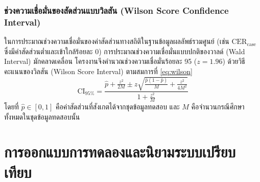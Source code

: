 \subsubsection{ช่วงความเชื่อมั่นของสัดส่วนแบบวิลสัน (Wilson Score Confidence Interval)}

ในการประมาณช่วงความเชื่อมั่นของค่าสัดส่วนทางสถิติในฐานข้อมูลผลลัพธ์รวมศูนย์ (เช่น $\mathrm{CER}_{\mathrm{case}}$ ซึ่งมีค่าสัดส่วนต่ำและเข้าใกล้ร้อยละ 0) การประมาณช่วงความเชื่อมั่นแบบปกติของวาลด์ (Wald Interval) มักคลาดเคลื่อน โครงงานจึงคำนวณช่วงความเชื่อมั่นร้อยละ 95 ($z = 1.96$) ด้วยวิธีคะแนนของวิลสัน (Wilson Score Interval) \cite{wilson1927probable} ตามสมการที่ \eqref{eq:wilson}
\begin{equation}
\mathrm{CI}_{95\%} = \frac{\hat{p} + \frac{z^2}{2M} \pm z \sqrt{\frac{\hat{p}(1-\hat{p})}{M} + \frac{z^2}{4M^2}}}{1 + \frac{z^2}{M}}
\label{eq:wilson}
\end{equation}
โดยที่ $\hat{p} \in [0, 1]$ คือค่าสัดส่วนที่สังเกตได้จากชุดข้อมูลทดสอบ และ $M$ คือจำนวนกรณีศึกษาทั้งหมดในชุดข้อมูลทดสอบนั้น

\section{การออกแบบการทดลองและนิยามระบบเปรียบเทียบ}
\label{sec:expdesign}

